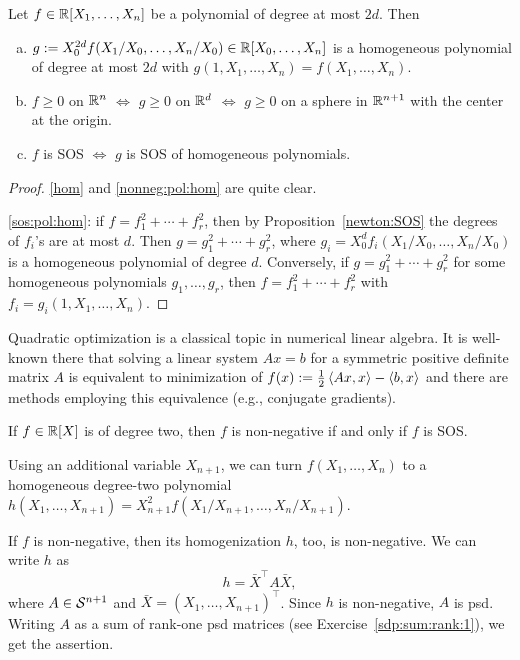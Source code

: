 \begin{lemma}
	Let $f \in \mathbb{R}[X_1,\ldots,X_n]$ be a polynomial of degree at most $2d$. Then
	\begin{enumerate}[(a)]
		\item \label{hom} $g:=X_0^{2d} f(X_1/X_0,\ldots,X_n/X_0) \in \mathbb{R}[X_0,\ldots,X_n]$ is a homogeneous polynomial of degree at most $2d$ with $g(1,X_1,\ldots,X_n) = f(X_1,\ldots,X_n)$.
		\item \label{nonneg:pol:hom} $f \ge 0$ on $\mathbb{R}^n$ $\Leftrightarrow$ $g \ge 0$ on $\mathbb{R}^d$ $\Leftrightarrow$ $g \ge 0$ on a sphere in $\mathbb{R}^{n+1}$ with the center at the origin.
		\item \label{sos:pol:hom} $f$ is SOS $\Leftrightarrow$ $g$ is SOS of homogeneous polynomials. 
	\end{enumerate}
\end{lemma}
\begin{proof}
	\eqref{hom} and \eqref{nonneg:pol:hom} are quite clear. 
	
	\eqref{sos:pol:hom}: if $f = f_1^2 + \cdots + f_r^2$, then by Proposition~\ref{newton:SOS} the degrees of $f_i$'s are at most $d$. Then $g = g_1^2 + \cdots + g_r^2$, where $g_i = X_0^d f_i(X_1/X_0,\ldots,X_n/X_0)$ is a homogeneous polynomial of degree $d$. Conversely, if $g= g_1^2  + \cdots + g_r^2$ for some homogeneous polynomials $g_1,\ldots,g_r$, then $f=f_1^2 + \cdots + f_r^2$ with $f_i = g_i(1,X_1,\ldots,X_n)$. 
\end{proof}

Quadratic optimization is a classical topic in numerical linear algebra. It is well-known there that solving a linear system $A x = b$ for a symmetric positive definite matrix $A$ is equivalent to minimization of $f(x):=\frac{1}{2} \left\langle A x , x \right\rangle - \left\langle b , x \right\rangle$ and there are methods employing this equivalence (e.g., conjugate gradients). 

\begin{exercise}
	\label{degree:two}
	If $f \in \mathbb{R}[X]$ is of degree two, then $f$ is non-negative if and only if $f$ is SOS. 
\end{exercise}
\begin{solution}
	Using an additional variable $X_{n+1}$, we can turn $f(X_1,\ldots,X_n)$ to a homogeneous degree-two polynomial $h(X_1,\ldots,X_{n+1})=X_{n+1}^2 f(X_1 / X_{n+1},\ldots,X_n / X_{n+1} )$. 
	
	If $f$ is non-negative, then its homogenization $h$, too, is non-negative. We can write $h$ as 
	\[ h = \bar{X}^\top A \bar{X}, \] where $A \in \mathcal{S}^{n+1}$ and $\bar{X} = (X_1,\ldots,X_{n+1})^\top$. Since $h$ is non-negative, $A$ is psd. Writing $A$ as a sum of rank-one psd matrices (see Exercise~\ref{sdp:sum:rank:1}), we get the assertion. 
\end{solution}


